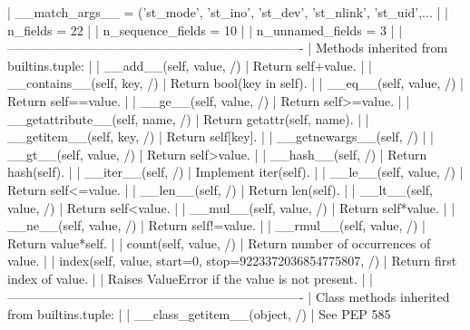 \documentclass{article}
\begin{document}
     |  __match_args__ = ('st_mode', 'st_ino', 'st_dev', 'st_nlink', 'st_uid',...
     |
     |  n_fields = 22
     |
     |  n_sequence_fields = 10
     |
     |  n_unnamed_fields = 3
     |
     |  ----------------------------------------------------------------------
     |  Methods inherited from builtins.tuple:
     |
     |  __add__(self, value, /)
     |      Return self+value.
     |
     |  __contains__(self, key, /)
     |      Return bool(key in self).
     |
     |  __eq__(self, value, /)
     |      Return self==value.
     |
     |  __ge__(self, value, /)
     |      Return self>=value.
     |
     |  __getattribute__(self, name, /)
     |      Return getattr(self, name).
     |
     |  __getitem__(self, key, /)
     |      Return self[key].
     |
     |  __getnewargs__(self, /)
     |
     |  __gt__(self, value, /)
     |      Return self>value.
     |
     |  __hash__(self, /)
     |      Return hash(self).
     |
     |  __iter__(self, /)
     |      Implement iter(self).
     |
     |  __le__(self, value, /)
     |      Return self<=value.
     |
     |  __len__(self, /)
     |      Return len(self).
     |
     |  __lt__(self, value, /)
     |      Return self<value.
     |
     |  __mul__(self, value, /)
     |      Return self*value.
     |
     |  __ne__(self, value, /)
     |      Return self!=value.
     |
     |  __rmul__(self, value, /)
     |      Return value*self.
     |
     |  count(self, value, /)
     |      Return number of occurrences of value.
     |
     |  index(self, value, start=0, stop=9223372036854775807, /)
     |      Return first index of value.
     |
     |      Raises ValueError if the value is not present.
     |
     |  ----------------------------------------------------------------------
     |  Class methods inherited from builtins.tuple:
     |
     |  __class_getitem__(object, /)
     |      See PEP 585
\end{document}
